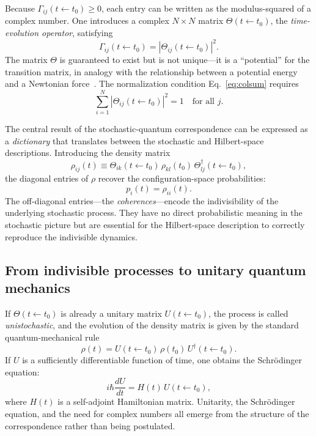 \documentclass[aps,prd,twocolumn,superscriptaddress,nofootinbib]{revtex4-2}
\begin{document}
Because $\Gamma_{ij}(t \leftarrow t_0) \geq 0$, each entry can be written as the modulus-squared of a complex number. One introduces a complex $N \times N$ matrix $\Theta(t \leftarrow t_0)$, the \emph{time-evolution operator}, satisfying
\begin{equation}
\Gamma_{ij}(t \leftarrow t_0) = |\Theta_{ij}(t \leftarrow t_0)|^2.
\label{eq:dictionary_basic}
\end{equation}
The matrix $\Theta$ is guaranteed to exist but is not unique---it is a ``potential'' for the transition matrix, in analogy with the relationship between a potential energy and a Newtonian force~\cite{Barandes2025SQC}. The normalization condition Eq.~\eqref{eq:colsum} requires
\begin{equation}
\sum_{i=1}^{N} |\Theta_{ij}(t \leftarrow t_0)|^2 = 1 \quad \text{for all } j.
\label{eq:theta_norm}
\end{equation}

The central result of the stochastic-quantum correspondence can be expressed as a \emph{dictionary} that translates between the stochastic and Hilbert-space descriptions. Introducing the density matrix
\begin{equation}
\rho_{ij}(t) \equiv \Theta_{ik}(t \leftarrow t_0)\, \rho_{kl}(t_0)\, \Theta^{\dagger}_{lj}(t \leftarrow t_0),
\label{eq:density_evolution}
\end{equation}
the diagonal entries of $\rho$ recover the configuration-space probabilities:
\begin{equation}
p_i(t) = \rho_{ii}(t).
\label{eq:diagonal}
\end{equation}
The off-diagonal entries---the \emph{coherences}---encode the indivisibility of the underlying stochastic process. They have no direct probabilistic meaning in the stochastic picture but are essential for the Hilbert-space description to correctly reproduce the indivisible dynamics.

\subsection{From indivisible processes to unitary quantum mechanics}

If $\Theta(t \leftarrow t_0)$ is already a unitary matrix $U(t \leftarrow t_0)$, the process is called \emph{unistochastic}, and the evolution of the density matrix is given by the standard quantum-mechanical rule
\begin{equation}
\rho(t) = U(t \leftarrow t_0)\, \rho(t_0)\, U^{\dagger}(t \leftarrow t_0).
\label{eq:unitary_evolution}
\end{equation}
If $U$ is a sufficiently differentiable function of time, one obtains the Schr\"{o}dinger equation:
\begin{equation}
i\hbar \frac{dU}{dt} = H(t)\, U(t \leftarrow t_0),
\label{eq:schrodinger}
\end{equation}
where $H(t)$ is a self-adjoint Hamiltonian matrix. Unitarity, the Schr\"{o}dinger equation, and the need for complex numbers all emerge from the structure of the correspondence rather than being postulated.
\end{document}
